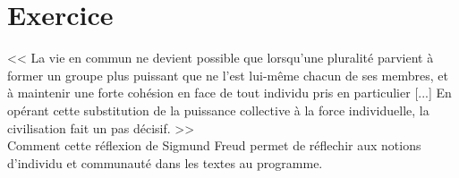 \documentclass[11pt]{article}
\begin{document}
\section{Exercice}

<< La vie en commun ne devient possible que lorsqu'une pluralité parvient à former un groupe plus puissant que ne l'est lui-même chacun de ses membres, et à maintenir une forte cohésion en face de tout individu pris en particulier [...]
En opérant cette substitution de la puissance collective à la force individuelle, la civilisation fait un pas décisif. >> \\
Comment cette réflexion de Sigmund Freud permet de réflechir aux notions d'individu et communauté dans les textes au programme.
\end{document}
